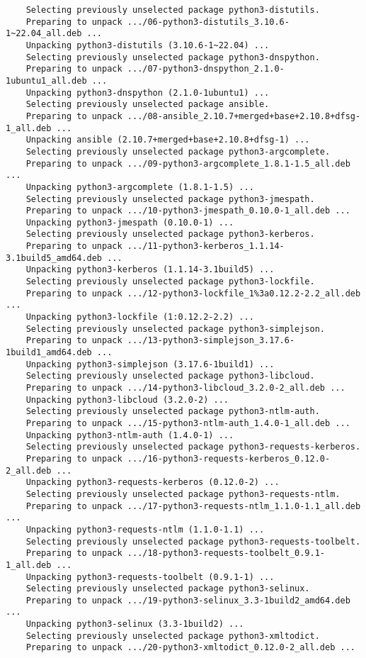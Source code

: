 \documentclass[../main.tex]{subfiles}
\begin{document}
\begin{lstlisting}
	Selecting previously unselected package python3-distutils.
	Preparing to unpack .../06-python3-distutils_3.10.6-1~22.04_all.deb ...
	Unpacking python3-distutils (3.10.6-1~22.04) ...
	Selecting previously unselected package python3-dnspython.
	Preparing to unpack .../07-python3-dnspython_2.1.0-1ubuntu1_all.deb ...
	Unpacking python3-dnspython (2.1.0-1ubuntu1) ...
	Selecting previously unselected package ansible.
	Preparing to unpack .../08-ansible_2.10.7+merged+base+2.10.8+dfsg-1_all.deb ...
	Unpacking ansible (2.10.7+merged+base+2.10.8+dfsg-1) ...
	Selecting previously unselected package python3-argcomplete.
	Preparing to unpack .../09-python3-argcomplete_1.8.1-1.5_all.deb ...
	Unpacking python3-argcomplete (1.8.1-1.5) ...
	Selecting previously unselected package python3-jmespath.
	Preparing to unpack .../10-python3-jmespath_0.10.0-1_all.deb ...
	Unpacking python3-jmespath (0.10.0-1) ...
	Selecting previously unselected package python3-kerberos.
	Preparing to unpack .../11-python3-kerberos_1.1.14-3.1build5_amd64.deb ...
	Unpacking python3-kerberos (1.1.14-3.1build5) ...
	Selecting previously unselected package python3-lockfile.
	Preparing to unpack .../12-python3-lockfile_1%3a0.12.2-2.2_all.deb ...
	Unpacking python3-lockfile (1:0.12.2-2.2) ...
	Selecting previously unselected package python3-simplejson.
	Preparing to unpack .../13-python3-simplejson_3.17.6-1build1_amd64.deb ...
	Unpacking python3-simplejson (3.17.6-1build1) ...
	Selecting previously unselected package python3-libcloud.
	Preparing to unpack .../14-python3-libcloud_3.2.0-2_all.deb ...
	Unpacking python3-libcloud (3.2.0-2) ...
	Selecting previously unselected package python3-ntlm-auth.
	Preparing to unpack .../15-python3-ntlm-auth_1.4.0-1_all.deb ...
	Unpacking python3-ntlm-auth (1.4.0-1) ...
	Selecting previously unselected package python3-requests-kerberos.
	Preparing to unpack .../16-python3-requests-kerberos_0.12.0-2_all.deb ...
	Unpacking python3-requests-kerberos (0.12.0-2) ...
	Selecting previously unselected package python3-requests-ntlm.
	Preparing to unpack .../17-python3-requests-ntlm_1.1.0-1.1_all.deb ...
	Unpacking python3-requests-ntlm (1.1.0-1.1) ...
	Selecting previously unselected package python3-requests-toolbelt.
	Preparing to unpack .../18-python3-requests-toolbelt_0.9.1-1_all.deb ...
	Unpacking python3-requests-toolbelt (0.9.1-1) ...
	Selecting previously unselected package python3-selinux.
	Preparing to unpack .../19-python3-selinux_3.3-1build2_amd64.deb ...
	Unpacking python3-selinux (3.3-1build2) ...
	Selecting previously unselected package python3-xmltodict.
	Preparing to unpack .../20-python3-xmltodict_0.12.0-2_all.deb ...

\end{lstlisting}
\end{document}
